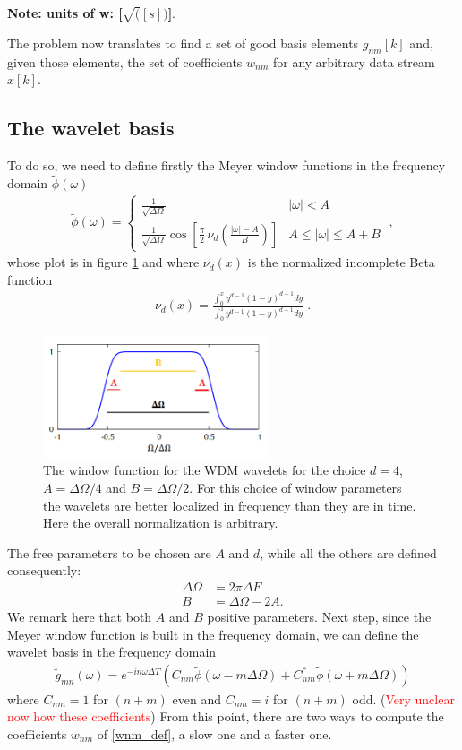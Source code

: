 \documentclass{article}
\begin{document}
\textbf{Note: units of w: [$\sqrt([s])$]}.

The problem now translates to find a set of good basis elements $g_{nm}[k]$ and, given those elements, the set of coefficients $w_{nm}$ for any arbitrary data stream $x[k]$.
\subsection{The wavelet basis}
To do so, we need to define firstly the Meyer window functions in the frequency domain $\tilde{\phi}(\omega)$
\begin{align}
\label{eq:meyer_window_freq}
\tilde\phi(\omega)=\left\{\begin{array}{lr}
\frac{1}{\sqrt{\Delta \Omega}} & |\omega|<A \\
\frac{1}{\sqrt{\Delta \Omega}} \cos \left[\frac{\pi}{2}\,\nu_d\left( \frac{|\omega|-A}{B}\right)\right] &A \leq|\omega| \leq A+B
\end{array}\right.\;,
\end{align}
whose plot is in figure \ref{fig:phi_omega} and where $\nu_d(x)$ is the normalized incomplete Beta function
\begin{align}
\nu_d(x)=\frac{\int_0^x y^{d-1}(1-y)^{d-1} d y}{\int_0^1 y^{d-1}(1-y)^{d-1} d y}\;.
\end{align}
%
\begin{figure}[ht!]
\centerline{
\includegraphics[width=0.6\textwidth,angle=0]{figures/phi_omega.png}
}
\caption{The window function for the WDM wavelets for the choice $d = 4$, $A =\Delta\Omega/4$ and $B = \Delta\Omega/2$. For this choice of window parameters the wavelets are better localized in frequency than they are in time. Here the overall normalization
is arbitrary.}
\label{fig:phi_omega}
\end{figure}
%
The free parameters to be chosen are $A$ and $d$, while all the others are defined consequently:
\begin{align}
\label{eq:window_bandwidth}
\Delta\Omega&=2\pi\Delta F\nonumber\\
B&=\Delta\Omega-2A.
\end{align}
We remark here that both $A$ and $B$ positive parameters. Next step, since the Meyer window function is built in the frequency domain, we can define the wavelet basis in the frequency domain
\begin{align}
\label{eq:gnm}
\tilde g_{mn}(\omega)=e^{-in\omega\Delta T}\left(C_{nm}\tilde\phi(\omega-m\Delta\Omega)+C^*_{nm}\tilde\phi(\omega+m\Delta\Omega)\right)
\end{align}
where $C_{nm}=1$ for $(n + m)$ even and $C_{nm}=i$ for $(n + m)$ odd.
(\textcolor{red}{Very unclear now how these coefficients})
From this point, there are two ways to compute the coefficients $w_{nm}$ of \eqref{wnm_def}, a slow one and a faster one.
\end{document}
